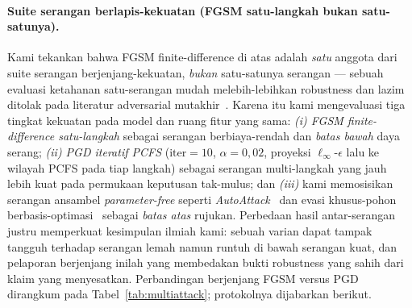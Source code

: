 \documentclass[11pt,a4paper]{article}
\begin{document}
\paragraph{Suite serangan berlapis-kekuatan (FGSM satu-langkah bukan satu-satunya).}
Kami tekankan bahwa FGSM finite-difference di atas adalah \emph{satu} anggota dari
suite serangan berjenjang-kekuatan, \emph{bukan} satu-satunya serangan --- sebuah
evaluasi ketahanan satu-serangan mudah melebih-lebihkan robustness dan lazim ditolak
pada literatur adversarial mutakhir~\cite{athalye2018,carlini2019evaluating}. Karena
itu kami mengevaluasi tiga tingkat kekuatan pada model dan ruang fitur yang sama:
\emph{(i) FGSM finite-difference satu-langkah} sebagai serangan berbiaya-rendah dan
\emph{batas bawah} daya serang; \emph{(ii) PGD iteratif PCFS}
($\text{iter}=10$, $\alpha=0{,}02$, proyeksi $\ell_\infty$-$\epsilon$ lalu ke wilayah
PCFS pada tiap langkah) sebagai serangan multi-langkah yang jauh lebih kuat pada
permukaan keputusan tak-mulus; dan \emph{(iii)} kami memosisikan serangan ansambel
\emph{parameter-free} seperti \emph{AutoAttack}~\cite{croce2020autoattack} dan evasi
khusus-pohon berbasis-optimasi~\cite{kantchelian2016} sebagai \emph{batas atas}
rujukan. Perbedaan hasil antar-serangan justru memperkuat kesimpulan ilmiah kami:
sebuah varian dapat tampak tangguh terhadap serangan lemah namun runtuh di bawah
serangan kuat, dan pelaporan berjenjang inilah yang membedakan bukti robustness yang
sahih dari klaim yang menyesatkan. Perbandingan berjenjang FGSM versus PGD
dirangkum pada Tabel~\ref{tab:multiattack}; protokolnya dijabarkan berikut.
\end{document}
